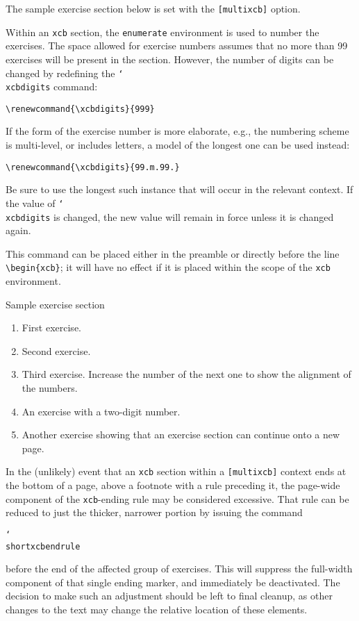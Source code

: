 \documentclass[multixcb]{amstext-l}
\theoremstyle{plain}
\theoremstyle{definition}
\newcommand{\cs}[1]{\texttt{\char`\\#1}}
\newcommand{\env}[1]{\texttt{#1}}
\newcommand{\opt}[1]{\texttt{[#1]}}
\newenvironment{exm}{%
  \par
  \begingroup
    \parindent0pt
    \leftskip2\normalparindent
    \obeylines
}{%
    \par
  \endgroup
}
\begin{document}
The sample exercise section below is set with the \opt{multixcb}
option.

Within an \env{xcb} section, the \env{enumerate} environment
is used to number the exercises.  The space allowed for exercise
numbers assumes that no more than 99 exercises will be present in
the section.  However, the number of digits can be changed by
redefining the \cs{xcbdigits} command:
\begin{exm}
\verb+\renewcommand{\xcbdigits}{999}+
\end{exm}
\noindent
If the form of the exercise number is more elaborate, e.g., the
numbering scheme is multi-level, or includes letters, a model of the
longest one can be used instead:
\begin{exm}
\verb+\renewcommand{\xcbdigits}{99.m.99.}+
\end{exm}
\noindent
Be sure to use the longest such instance that will occur in the
relevant context.  If the value of \cs{xcbdigits} is changed, the
new value will remain in force unless it is changed again.

This command can be placed either in the preamble or directly before
the line \verb+\begin{xcb}+; it will have no effect if it is placed
within the scope of the \env{xcb} environment.

\begin{xcb}{Sample exercise section}

\begin{enumerate}
\item First exercise.
\item Second exercise.
\item Third exercise.  Increase the number of the next one to show
  the alignment of the numbers.
\setcounter{enumi}{11}
\item An exercise with a two-digit number.
\item Another exercise showing that an exercise section can continue
  onto a new page.
\end{enumerate}

\end{xcb}

In the (unlikely) event that an \env{xcb} section within a
\opt{multixcb} context ends at the bottom of a page, above a footnote
with a rule preceding it, the page-wide component of the
\env{xcb}-ending rule may be considered excessive.  That rule can be
reduced to just the thicker, narrower portion by issuing the command
\begin{exm}
\cs{shortxcbendrule}
\end{exm}
\noindent
before the end of the affected group of exercises.  This will suppress
the full-width component of that single ending marker, and immediately
be deactivated.  The decision to make such an adjustment should be left
to final cleanup, as other changes to the text may change the relative
location of these elements.
\end{document}
